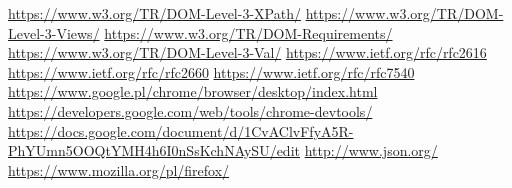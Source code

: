 \documentclass[polish, twoside, 12pt]{mwart}
\begin{document}
\begin{thebibliography}{11}
    \url{https://www.w3.org/TR/DOM-Level-3-XPath/}
    \url{https://www.w3.org/TR/DOM-Level-3-Views/}
    \url{https://www.w3.org/TR/DOM-Requirements/}
    \url{https://www.w3.org/TR/DOM-Level-3-Val/}
    \url{https://www.ietf.org/rfc/rfc2616}
    \url{https://www.ietf.org/rfc/rfc2660}
    \url{https://www.ietf.org/rfc/rfc7540}
    \url{https://www.google.pl/chrome/browser/desktop/index.html}
    \url{https://developers.google.com/web/tools/chrome-devtools/}
    \url{https://docs.google.com/document/d/1CvAClvFfyA5R-PhYUmn5OOQtYMH4h6I0nSsKchNAySU/edit}
    \url{http://www.json.org/}
    \url{https://www.mozilla.org/pl/firefox/}
\end{thebibliography}
\end{document}
